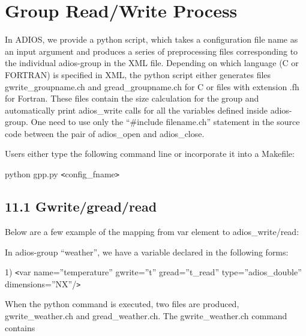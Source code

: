 \vspace{22pt}
\section{Group Read/Write Process}

\vspace{24pt}
In ADIOS, we provide a python script, which takes a configuration file name as 
an input argument and produces a series of preprocessing files corresponding to 
the individual adios-group in the XML file. Depending on which language (C or FORTRAN) 
is specified in XML, the python script either generates files gwrite\_groupname.ch 
and gread\_groupname.ch for C or files with extension .fh for Fortran. These files 
contain the size calculation for the group and automatically print adios\_write 
calls for all the variables defined inside adios-group. One need to use only the 
``\#include filename.ch'' statement in the source code between the pair of adios\_open 
and adios\_close.

\vspace{24pt}
Users either type the following command line or incorporate it into a Makefile:

\vspace{24pt}
python gpp.py \texttt{<}config\_fname\texttt{>}\label{HToc84890287}\label{HToc212016663}\label{HToc212016905}\label{HToc182553436}

\vspace{24pt}
\subsection*{{\large 11.1 }{\large \textbf{Gwrite/gread/read}}}

\vspace{10pt}
Below are a few example of the mapping from var element to adios\_write/read:

\vspace{10pt}
In adios-group ``weather'', we have a variable declared in the following forms:

\vspace{10pt}
1) \texttt{<}var name=''temperature'' gwrite=''t'' gread=''t\_read'' type=''adios\_double'' 
dimensions=''NX''/\texttt{>}

\vspace{10pt}
When the python command is executed, two files are produced, gwrite\_weather.ch 
and gread\_weather.ch. The gwrite\_weather.ch command contains 

